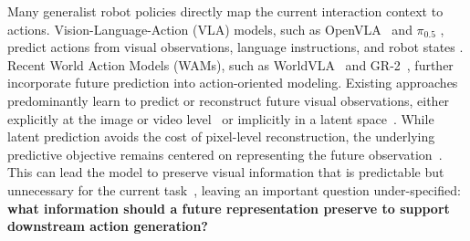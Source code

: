 \documentclass{article} %
\begin{document}


Many generalist robot policies directly map the current interaction context to actions. Vision-Language-Action (VLA) models, such as OpenVLA~\cite{kim2024openvla} and $\pi_{0.5}$ \cite{black2024pi0,black2025pi05}, predict actions from visual observations, language instructions, and robot states \cite{brohan2023rt2,octo2024}. Recent World Action Models (WAMs), such as WorldVLA~\cite{cen2025worldvla} and GR-2~\cite{cheang2024gr2}, further incorporate future prediction into action-oriented modeling. Existing approaches predominantly learn to predict or reconstruct future visual observations, either explicitly at the image or video level~\cite{ye2026worldactionmodelszeroshot,motubrainteam2026motubrainadvancedworldaction} or implicitly in a latent space~\cite{cen2025worldvla,sun2026vlajepa}. While latent prediction avoids the cost of pixel-level reconstruction, the underlying predictive objective remains centered on representing the future observation~\cite{bi2025motusunifiedlatentaction}. This can lead the model to preserve visual information that is predictable but unnecessary for the current task~\cite{yuan2026fastwamworldactionmodels}, leaving an important question under-specified: \textbf{what information should a future representation preserve to support downstream action generation?}
\end{document}
